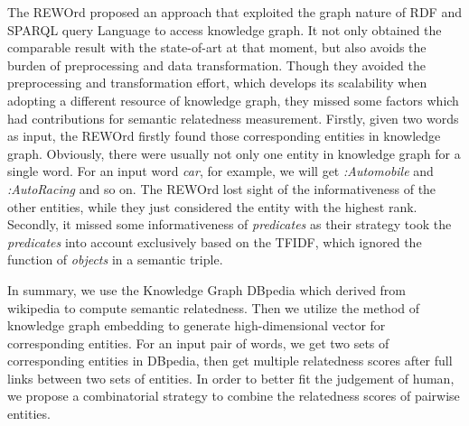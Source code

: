 The REWOrd\cite{aaai/Pirro12} proposed an approach that exploited the graph nature of RDF and SPARQL query
Language to access knowledge graph. It not only obtained the comparable
result with the state-of-art at that moment, but also avoids the burden
of preprocessing and data transformation.
Though they avoided the preprocessing and transformation effort,
which develops its scalability when adopting a different resource of knowledge graph,
they missed some factors which had contributions for semantic relatedness measurement. Firstly, given two words
as input, the REWOrd firstly found those corresponding entities in knowledge
graph. Obviously, there were usually not only one entity in knowledge graph for a single
word. For an input word \emph{car}, for example, we will get \emph{:Automobile} and
\emph{:Auto\underline{\hspace{0.5em}}Racing} and so on. The REWOrd lost
sight of the informativeness of the other entities, while they just
considered the entity with the highest rank. Secondly, it missed
some informativeness of \emph{predicates} as their strategy took
the \emph{predicates} into account exclusively based on the TFIDF,
which ignored the function of \emph{objects} in a semantic triple.

In summary, we use the Knowledge Graph DBpedia which derived from wikipedia to compute semantic relatedness.
Then we utilize the method of knowledge graph embedding to generate high-dimensional vector for corresponding
entities. For an input pair of words, we get two sets of corresponding entities in DBpedia, then get multiple
relatedness scores after full links between two sets of entities.
In order to better fit the judgement of human, we propose a combinatorial strategy to combine
the relatedness scores of pairwise entities.